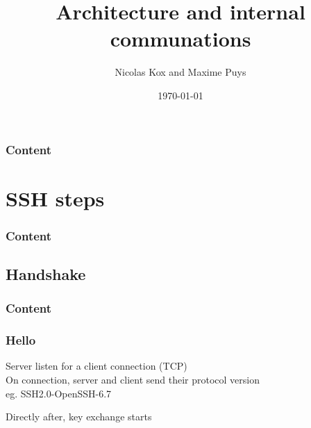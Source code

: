 \documentclass{beamer}
\title{Architecture and internal communations}
\author{Nicolas Kox and Maxime Puys}
\date{\today}
\begin{document}
\begin{frame}
    \maketitle
\end{frame}



\begin{frame}
\frametitle{Content}
\tableofcontents
\end{frame}


\section{SSH steps}


\begin{frame}
\frametitle{Content}
\tableofcontents[currentsection]
\end{frame}





\subsection{Handshake}


\begin{frame}
\frametitle{Content}
\tableofcontents[currentsubsection]
\end{frame}




\begin{frame}
\frametitle{Hello}

Server listen for a client connection (TCP)\\
On connection, server and client send their protocol version\\
eg. SSH2.0-OpenSSH-6.7\\
\vspace{10 mm}

Directly after, key exchange starts

\end{frame} 
\end{document}
